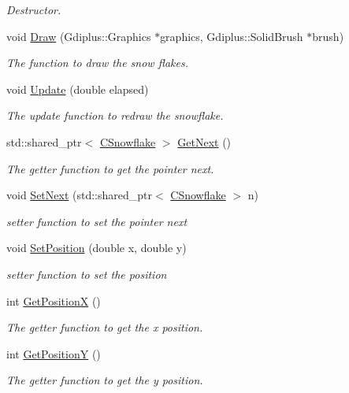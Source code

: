 \begin{DoxyCompactItemize}
\begin{DoxyCompactList}\small\item\em Destructor. \end{DoxyCompactList}\item 
void \hyperlink{class_c_snowflake_a1002ccff7dc55143e7e9879f7f6ab8fb}{Draw} (Gdiplus\+::\+Graphics $\ast$graphics, Gdiplus\+::\+Solid\+Brush $\ast$brush)
\begin{DoxyCompactList}\small\item\em The function to draw the snow flakes. \end{DoxyCompactList}\item 
void \hyperlink{class_c_snowflake_a4ff5173791cdab56885c9ae1dced9d05}{Update} (double elapsed)
\begin{DoxyCompactList}\small\item\em The update function to redraw the snowflake. \end{DoxyCompactList}\item 
std\+::shared\+\_\+ptr$<$ \hyperlink{class_c_snowflake}{C\+Snowflake} $>$ \hyperlink{class_c_snowflake_ae228ed6b4121315e019efc5ff7acd2e8}{Get\+Next} ()
\begin{DoxyCompactList}\small\item\em The getter function to get the pointer next. \end{DoxyCompactList}\item 
void \hyperlink{class_c_snowflake_a5a763ea12e70d4e4fb82571636f761ef}{Set\+Next} (std\+::shared\+\_\+ptr$<$ \hyperlink{class_c_snowflake}{C\+Snowflake} $>$ n)
\begin{DoxyCompactList}\small\item\em setter function to set the pointer next \end{DoxyCompactList}\item 
void \hyperlink{class_c_snowflake_a4a5c3acf9fe94454a3409ace089356ea}{Set\+Position} (double x, double y)
\begin{DoxyCompactList}\small\item\em setter function to set the position \end{DoxyCompactList}\item 
int \hyperlink{class_c_snowflake_a785bd07f9b7341606e94204e6be7af67}{Get\+Position\+X} ()
\begin{DoxyCompactList}\small\item\em The getter function to get the x position. \end{DoxyCompactList}\item 
int \hyperlink{class_c_snowflake_a047611d7e82786fec3d329f4579ef823}{Get\+Position\+Y} ()
\begin{DoxyCompactList}\small\item\em The getter function to get the y position. \end{DoxyCompactList}\end{DoxyCompactItemize}


